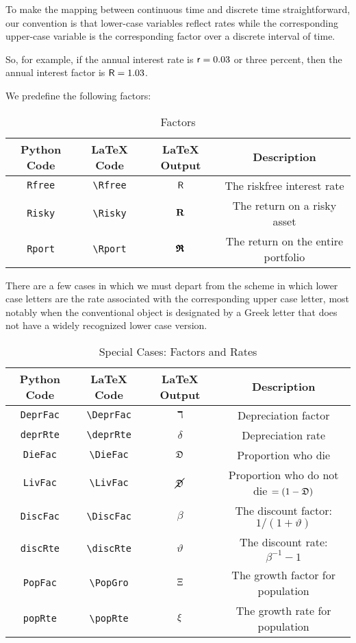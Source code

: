 
To make the mapping between continuous time and discrete time straightforward, our
convention is that lower-case variables reflect rates while the corresponding upper-case
variable is the corresponding factor over a discrete interval of time.

So, for example, if the annual interest rate is $\mathsf{r}=0.03$ or three percent, then
the annual interest factor is $\mathsf{R}=1.03$.

We predefine the following factors:
\begin{table}[h]
	\centering
	\begin{tabular}{||>{\ttfamily}cccc||}
		\hline
		 Python Code & LaTeX Code & LaTeX Output & Description
\\ \hline  \texttt{Rfree}    & \verb|\Rfree|    & $\mathsf{R}$    & The riskfree interest rate
\\ \texttt{Risky}    & \verb|\Risky|    & $\mathbf{R}$    & The return on a risky asset
\\ \texttt{Rport}    & \verb|\Rport|    & $\pmb{\mathfrak{R}}$    & The return on the entire portfolio
\\	\hline
	\end{tabular}
	\caption{Factors}
	\label{table:Factors}
\end{table}

There are a few cases in which we must depart from the scheme in which lower case letters are
the rate associated with the corresponding upper case letter, most notably when the conventional
object is designated by a Greek letter that does not have a widely recognized lower case version.

\newcommand{\DiscFac}{\beta}
\newcommand{\discRte}{\vartheta}
\newcommand{\deprRte}{\delta}
\newcommand{\DieFac}{\pDead}
\newcommand{\LivFac}{\Alive}
\newcommand{\PopFac}{\PopGro}
\newcommand{\popRte}{\popGro}
\begin{table}[h]
	\centering
	\begin{tabular}{||>{\ttfamily}cccc||}
		\hline
		 Python Code & LaTeX Code & LaTeX Output & Description \\
		\hline
   \texttt{DeprFac} & \verb|\DeprFac|    & $\daleth$    & Depreciation factor
\\ \texttt{deprRte} & \verb|\deprRte|    & $\deprRte$    & Depreciation rate
\\ \texttt{DieFac}  & \verb|\DieFac|     & $\DieFac$     & Proportion who die
\\ \texttt{LivFac}  & \verb|\LivFac|     & $\LivFac$     & Proportion who do not die $=(1-\DieFac)$
\\ \texttt{DiscFac} & \verb|\DiscFac|    & $\DiscFac$    & The discount factor: $1/(1+\discRte)$
\\ \texttt{discRte} & \verb|\discRte|    & $\discRte$    & The discount rate: $\DiscFac^{-1}-1$
\\ \texttt{PopFac}  & \verb|\PopGro|     & $\Xi$     & The growth factor for population
\\ \texttt{popRte}  & \verb|\popRte|     & $\popRte$     & The growth rate for population
\\	\hline
	\end{tabular}
	\caption{Special Cases: Factors and Rates}
	\label{table:SpecialFactors}
\end{table}


